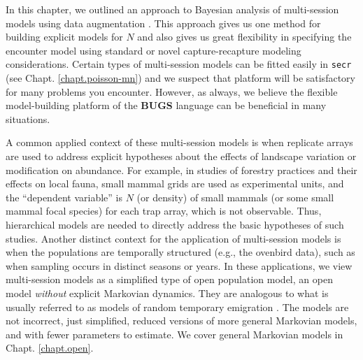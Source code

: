 In this chapter, we outlined an approach to Bayesian analysis of
multi-session models using data augmentation
\citet{converse_royle:2012, royle_converse:2013}.  This approach gives
us one method for building explicit models for $N$ and also gives us
great flexibility in specifying the encounter model using standard or
novel capture-recapture modeling considerations. Certain types of
multi-session models can be fitted easily in \mbox{\tt secr} (see
Chapt. \ref{chapt.poisson-mn}) and we suspect that platform will be
satisfactory for many problems you encounter. However, as always, we
believe the flexible model-building platform of the {\bf BUGS}
language can be beneficial in many situations.

A common applied context of these multi-session models is when
replicate arrays are used to address explicit hypotheses about the
effects of landscape variation or modification on abundance. For
example, in studies of forestry practices and their effects on local
fauna, small mammal grids are used as experimental units, and the
``dependent variable'' is $N$ (or density) of small mammals (or some
small mammal focal species) for each trap array, which is not
observable.  Thus, hierarchical models are needed to directly address
the basic hypotheses of such studies.  Another distinct context for
the application of multi-session models is when the populations are
temporally structured (e.g., the ovenbird data), such as when sampling
occurs in distinct seasons or years.  In these applications, we view
multi-session models as a simplified type of open population model, an
open model {\it without} explicit Markovian dynamics. They are
analogous to what is usually referred to as models of random temporary
emigration \citep{kendall_etal:1997, chandler_etal:2011}.  The models
are not incorrect, just simplified, reduced versions of more general
Markovian models, and with fewer parameters to estimate.  We cover
general Markovian models in Chapt. \ref{chapt.open}.















